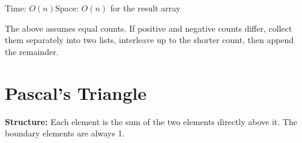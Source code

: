 \documentclass[12pt,a4paper,oneside]{book}
\begin{document}
\begin{complexity}
Time: $O(n)$\quad Space: $O(n)$ for the result array
\end{complexity}

\begin{warningbox}
The above assumes equal counts. If positive and negative counts differ, collect them separately into two lists, interleave up to the shorter count, then append the remainder.
\end{warningbox}

\section{Pascal's Triangle}

\textbf{Structure:} Each element is the sum of the two elements directly above it. The boundary elements are always 1.

\begin{center}
\end{center}
\end{document}
